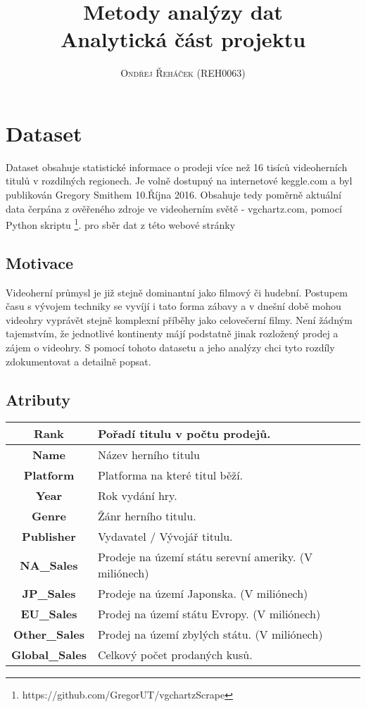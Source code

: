 \documentclass[a4paper,11pt]{article}
\title{\Huge \textbf{Metody analýzy dat}  
\\ \huge Analytická část projektu }
\author{\textsc{Ondřej Řeháček (REH0063)}}
\begin{document}
\maketitle


\section{Dataset}
Dataset obsahuje statistické informace o prodeji více než 16 tisíců videoherních titulů v rozdilných regionech. Je volně dostupný na internetové keggle.com a byl publikován Gregory Smithem 10.Října 2016. Obsahuje tedy poměrně aktuální data čerpána z ověřeného zdroje ve videoherním světě - vgchartz.com, pomocí Python skriptu \footnote{https://github.com/GregorUT/vgchartzScrape}. pro sběr dat z této webové stránky 

\subsection{Motivace}
Videoherní průmysl je již stejně dominantní jako filmový či hudební. Postupem času s vývojem techniky se vyvíjí i tato forma zábavy a v dnešní době mohou videohry vyprávět stejně komplexní příběhy jako celovečerní filmy. Není žádným tajemstvím, že jednotlivé kontinenty májí podstatně jinak rozložený prodej a zájem o videohry. S pomocí tohoto datasetu a jeho analýzy chci tyto rozdíly zdokumentovat a detailně popsat.

\subsection{Atributy}
\begin{tabular}{|c|l|}
\hline
\textbf{Rank} & Pořadí titulu v počtu prodejů. \\ \hline
\textbf{Name} & Název herního titulu \\ \hline
\textbf{Platform} & Platforma na které titul běží. \\ \hline
\textbf{Year} & Rok vydání hry. \\ \hline
\textbf{Genre} & Žánr herního titulu. \\ \hline
\textbf{Publisher} & Vydavatel / Vývojář titulu. \\ \hline
\textbf{NA\_Sales} & Prodeje na území státu serevní ameriky. (V miliónech) \\ \hline
\textbf{JP\_Sales} & Prodeje na území Japonska. (V miliónech) \\ \hline
\textbf{EU\_Sales} & Prodej na území státu Evropy. (V miliónech) \\ \hline
\textbf{Other\_Sales} & Prodej na území zbylých státu. (V miliónech) \\ \hline
\textbf{Global\_Sales} & Celkový počet prodaných kusů. \\ \hline
\end{tabular}
\end{document}
